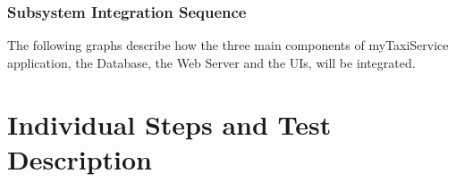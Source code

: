 \documentclass{article}
\begin{document}
\subsubsection{Subsystem Integration Sequence}
The following graphs describe how the three 
main components of myTaxiService application, 
the Database, the Web Server and 
the UIs, will be integrated.
\begin{figure}[H]
\end{figure}
\begin{figure}[H]
\end{figure}
\begin{figure}[H]
\end{figure}
\begin{figure}[H]
\end{figure}
\section{Individual Steps and Test Description}
\end{document}
